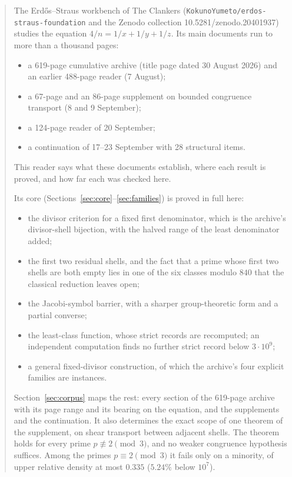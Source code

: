 \begin{abstract}
\noindent
The Erdős--Straus workbench of The Clankers (\texttt{KokunoYumeto/erdos-straus-foundation} and the Zenodo collection 10.5281/zenodo.20401937) studies the equation $4/n=1/x+1/y+1/z$. Its main documents run to more than a thousand pages:
\begin{itemize}
\item a 619-page cumulative archive (title page dated 30 August 2026) and an earlier 488-page reader (7 August);
\item a 67-page and an 86-page supplement on bounded congruence transport (8 and 9 September);
\item a 124-page reader of 20 September;
\item a continuation of 17--23 September with 28 structural items.
\end{itemize}
This reader says what these documents establish, where each result is proved, and how far each was checked here.

Its core (Sections~\ref{sec:core}--\ref{sec:families}) is proved in full here:
\begin{itemize}
\item the divisor criterion for a fixed first denominator, which is the archive's divisor-shell bijection, with the halved range of the least denominator added;
\item the first two residual shells, and the fact that a prime whose first two shells are both empty lies in one of the six classes modulo $840$ that the classical reduction leaves open;
\item the Jacobi-symbol barrier, with a sharper group-theoretic form and a partial converse;
\item the least-class function, whose strict records are recomputed; an independent computation finds no further strict record below $3\cdot10^9$;
\item a general fixed-divisor construction, of which the archive's four explicit families are instances.
\end{itemize}
Section~\ref{sec:corpus} maps the rest: every section of the 619-page archive with its page range and its bearing on the equation, and the supplements and the continuation. It also determines the exact scope of one theorem of the supplement, on shear transport between adjacent shells. The theorem holds for every prime $p\not\equiv2\pmod3$, and no weaker congruence hypothesis suffices. Among the primes $p\equiv2\pmod3$ it fails only on a minority, of upper relative density at most $0.335$ ($5.24\%$ below $10^7$).


\end{abstract}
